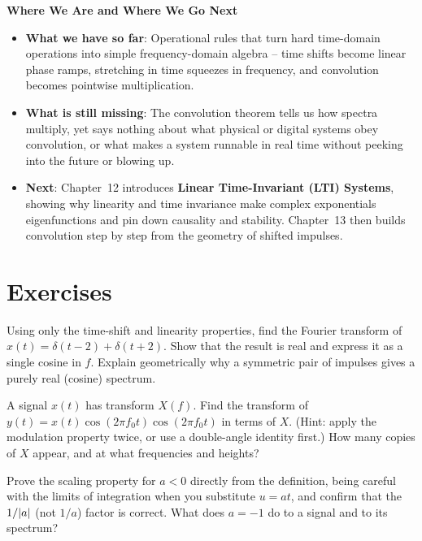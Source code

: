 \begin{connectionbox}
\textbf{Where We Are and Where We Go Next}
\begin{itemize}
  \item \textbf{What we have so far}: Operational rules that turn hard time-domain operations into
  simple frequency-domain algebra -- time shifts become linear phase ramps, stretching in time
  squeezes in frequency, and convolution becomes pointwise multiplication.
  \item \textbf{What is still missing}: The convolution theorem tells us how spectra multiply, yet
  says nothing about what physical or digital systems obey convolution, or what makes a
  system runnable in real time without peeking into the future or blowing up.
  \item \textbf{Next}: Chapter~12 introduces \textbf{Linear Time-Invariant (LTI) Systems}, showing
  why linearity and time invariance make complex exponentials eigenfunctions and pin down causality
  and stability. Chapter~13 then builds convolution step by step from the geometry of shifted
  impulses.
\end{itemize}
\end{connectionbox}

\section{Exercises}
\label{ch11:exercises}

\begin{exercise}
Using only the time-shift and linearity properties, find the Fourier transform of
$x(t) = \delta(t - 2) + \delta(t + 2)$. Show that the result is real and express
it as a single cosine in $f$. Explain geometrically why a symmetric pair of
impulses gives a purely real (cosine) spectrum.
\end{exercise}

\begin{exercise}
A signal $x(t)$ has transform $X(f)$. Find the transform of
$y(t) = x(t)\cos(2\pi f_0 t)\allowbreak\cos(2\pi f_0 t)$ in terms of $X$. (Hint: apply the
modulation property twice, or use a double-angle identity first.) How many copies
of $X$ appear, and at what frequencies and heights?
\end{exercise}

\begin{exercise}
Prove the scaling property for $a < 0$ directly from the definition, being
careful with the limits of integration when you substitute $u = at$, and confirm
that the $1/\lvert a\rvert$ (not $1/a$) factor is correct. What does $a = -1$ do to a
signal and to its spectrum?
\end{exercise}

